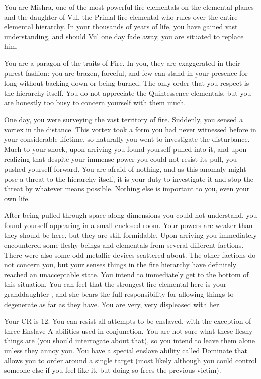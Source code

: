 \documentclass[green]{elementals}
\begin{document}
\name{\gElderElemental{}}

You are Mishra, one of the most powerful fire elementals on the elemental planes and the daughter of Vul, the Primal fire elemental who rules over the entire elemental hierarchy. In your thousands of years of life, you have gained vast understanding, and should Vul one day fade away, you are situated to replace him.

You are a paragon of the traits of Fire. In you, they are exaggerated in their purest fashion: you are brazen, forceful, and few can stand in your presence for long without backing down or being burned. The only order that you respect is the hierarchy itself. You do not appreciate the Quintessence elementals, but you are honestly too busy to concern yourself with them much.

One day, you were surveying the vast territory of fire. Suddenly, you sensed a vortex in the distance. This vortex took a form you had never witnessed before in your considerable lifetime, so naturally you went to investigate the disturbance. Much to your shock, upon arriving you found yourself pulled into it, and upon realizing that despite your immense power you could not resist its pull, you pushed yourself forward. You are afraid of nothing, and as this anomaly might pose a threat to the hierarchy itself, it is your duty to investigate it and stop the threat by whatever means possible. Nothing else is important to you, even your own life.

After being pulled through space along dimensions you could not understand, you found yourself appearing in a small enclosed room. Your powers are weaker than they should be here, but they are still formidable. Upon arriving you immediately encountered some fleshy beings and elementals from several different factions. There were also some odd metallic devices scattered about. The other factions do not concern you, but your senses things in the fire hierarchy have definitely reached an unacceptable state. You intend to immediately get to the bottom of this situation. You can feel that the strongest fire elemental here is your granddaughter \cQueen{\intro}, and she bears the full responsibility for allowing things to degenerate as far as they have. You are very, very displeased with her.

Your CR is 12. You can resist all attempts to be enslaved, with the exception of three Enslave A abilities used in conjunction. You are not sure what these fleshy things are (you should interrogate \cQueen{} about that), so you intend to leave them alone unless they annoy you. You have a special enslave ability called Dominate that allows you to order around a single target (most likely \cQueen{} although you could control someone else if you feel like it, but doing so frees the previous victim).
\end{document}
